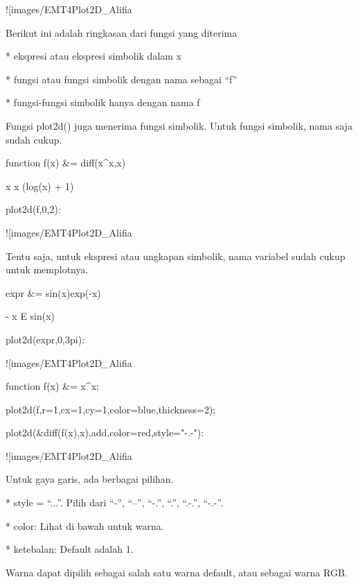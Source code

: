 \documentclass{article}
\begin{document}
![images/EMT4Plot2D_Alifia%

Berikut ini adalah ringkasan dari fungsi yang diterima


* 
ekspresi atau ekspresi simbolik dalam x

* 
fungsi atau fungsi simbolik dengan nama sebagai “f”

* 
fungsi-fungsi simbolik hanya dengan nama f


Fungsi plot2d() juga menerima fungsi simbolik. Untuk fungsi simbolik,
nama saja sudah cukup.


\>function f(x) &= diff(x^x,x)


    
                                x
                               x  (log(x) + 1)
    

\>plot2d(f,0,2):


![images/EMT4Plot2D_Alifia%

Tentu saja, untuk ekspresi atau ungkapan simbolik, nama variabel sudah
cukup untuk memplotnya.


\>expr &= sin(x)\*exp(-x)


    
                                  - x
                                 E    sin(x)
    

\>plot2d(expr,0,3pi):


![images/EMT4Plot2D_Alifia%

\>function f(x) &= x^x;

\>plot2d(f,r=1,cx=1,cy=1,color=blue,thickness=2);

\>plot2d(&diff(f(x),x),\>add,color=red,style="-.-"):


![images/EMT4Plot2D_Alifia%

Untuk gaya garis, ada berbagai pilihan.


* 
style = “...”. Pilih dari “-”, “--”, “-.”, “.”, “.-.”, “-.-”.

* 
color: Lihat di bawah untuk warna.

* 
ketebalan: Default adalah 1.


Warna dapat dipilih sebagai salah satu warna default, atau sebagai
warna RGB.
\end{document}
